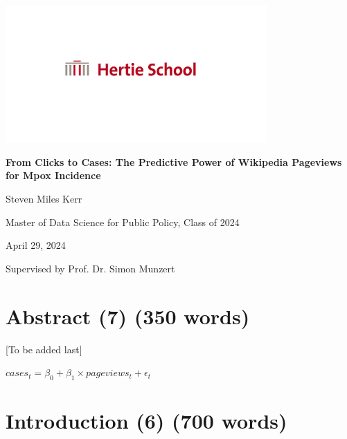 \documentclass[
  12pt,
]{article}
\author{Steven Kerr}
\date{27 April 2024}
\begin{document}
\begin{titlepage}
    \centering
    \includegraphics[width=0.75\textwidth]{img/hertie-school-logo.jpg}
    \vspace*{\fill}
    
    \textbf{From Clicks to Cases: The Predictive Power of Wikipedia Pageviews for Mpox Incidence}

    \vspace{2.5cm}

    Steven Miles Kerr

    \vspace{1cm}
    
    Master of Data Science for Public Policy, Class of 2024\\
    
    \vspace{0.5cm}

    April 29, 2024\\

    \vspace*{\fill}

    Supervised by Prof. Dr. Simon Munzert

\end{titlepage}

\tableofcontents
\thispagestyle{empty}
\newpage

\setcounter{page}{1}

\section{Abstract (7) (350 words)}\label{abstract-7-350-words}

{[}To be added last{]}

\(cases_t = \beta_0 + \beta_1 \times pageviews_t + \epsilon_t\)

\section{Introduction (6) (700 words)}\label{introduction-6-700-words}
\end{document}
